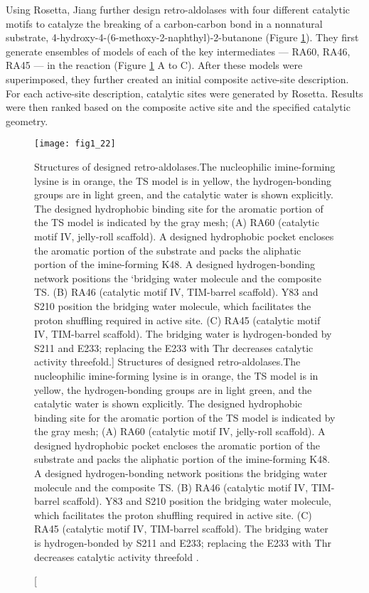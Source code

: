\begin{refsection}
Using Rosetta, Jiang  further design retro-aldolases with four
different catalytic motifs to catalyze the breaking of a carbon-carbon bond in
a nonnatural substrate, 4-hydroxy-4-(6-methoxy-2-naphthyl)-2-butanone
\cite{Jiang2008} (Figure \ref{fig:rosetta-enzyme}). They first generate
ensembles of models of each of the key intermediates --- RA60, RA46, RA45 ---
in the reaction (Figure \ref{fig:rosetta-enzyme} A to C).  After these models
were superimposed, they further created an initial composite active-site
description. For each active-site description, catalytic sites were generated
by Rosetta. Results were then ranked based on the composite active site and the
specified catalytic geometry.
\begin{figure}[htbp] \centering \texttt{[image: fig1\_22]}
    \caption[Structures of designed retro-aldolases.The nucleophilic imine-forming
        lysine is in orange, the TS model is in yellow, the hydrogen-bonding
        groups are in light green, and the catalytic water is shown explicitly.
        The designed hydrophobic binding site for the aromatic portion of the
        TS model is indicated by the gray mesh; (A) RA60 (catalytic motif IV,
        jelly-roll scaffold). A designed hydrophobic pocket encloses the
        aromatic portion of the substrate and packs the aliphatic portion of
        the imine-forming K48. A designed hydrogen-bonding network positions
        the `bridging water molecule and the composite TS. (B) RA46 (catalytic
        motif IV, TIM-barrel scaffold). Y83 and S210 position the bridging
        water molecule, which facilitates the proton shuffling required in
        active site. (C) RA45 (catalytic motif IV, TIM-barrel scaffold). The
        bridging water is hydrogen-bonded by S211 and E233; replacing the
    E233 with Thr decreases catalytic activity threefold.] {Structures of
        designed retro-aldolases.The nucleophilic imine-forming lysine is in
        orange, the TS model is in yellow, the hydrogen-bonding groups are in
        light green, and the catalytic water is shown explicitly. The designed
        hydrophobic binding site for the aromatic portion of the TS model is
        indicated by the gray mesh; (A) RA60 (catalytic motif IV, jelly-roll
        scaffold). A designed hydrophobic pocket encloses the aromatic portion
        of the substrate and packs the aliphatic portion of the imine-forming
        K48. A designed hydrogen-bonding network positions the bridging water
        molecule and the composite TS. (B) RA46 (catalytic motif IV, TIM-barrel
        scaffold). Y83 and S210 position the bridging water molecule, which
        facilitates the proton shuffling required in active site. (C) RA45
        (catalytic motif IV, TIM-barrel scaffold). The bridging water is
        hydrogen-bonded by S211 and E233; replacing the E233 with Thr
        decreases catalytic activity threefold \cite{Jiang2008}.} 
        \label{fig:rosetta-enzyme} 
\end{figure}


\end{refsection}
